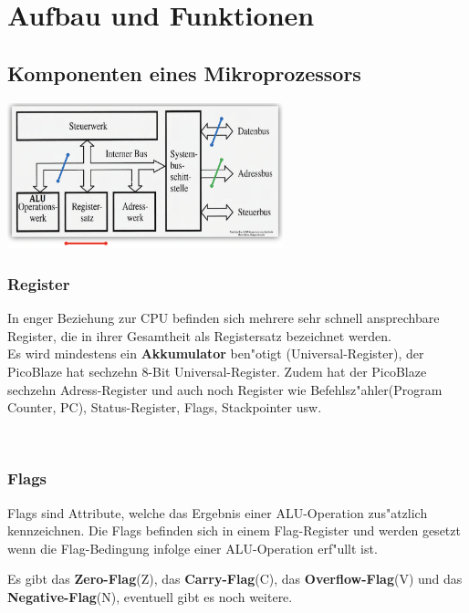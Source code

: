 \section{Aufbau und Funktionen}
\subsection{Komponenten eines Mikroprozessors}
\includegraphics[width = 8cm]{pics/Komponenten-Mikroprozessor}

\begin{minipage}[t]{9cm}
	\subsubsection{Register}
	In enger Beziehung zur CPU befinden sich mehrere sehr schnell ansprechbare Register, die in ihrer Gesamtheit als Registersatz bezeichnet werden.\\
	Es wird mindestens ein \textbf{Akkumulator} ben"otigt (Universal-Register), der PicoBlaze hat sechzehn 8-Bit Universal-Register. Zudem hat der PicoBlaze sechzehn Adress-Register und auch noch Register wie Befehlsz"ahler(Program Counter, PC), Status-Register, Flags, Stackpointer usw.
\end{minipage}
%
\begin{minipage}{0.5cm}
	\ \
\end{minipage}
%
\begin{minipage}[t]{9cm}
	\subsubsection{Flags}
	Flags sind Attribute, welche das Ergebnis einer ALU-Operation zus"atzlich kennzeichnen. Die Flags befinden sich in einem Flag-Register und werden gesetzt wenn die Flag-Bedingung infolge einer ALU-Operation erf"ullt ist.
	
	Es gibt das \textbf{Zero-Flag}(Z), das \textbf{Carry-Flag}(C), das \textbf{Overflow-Flag}(V) und das \textbf{Negative-Flag}(N), eventuell gibt es noch weitere.
\end{minipage}

